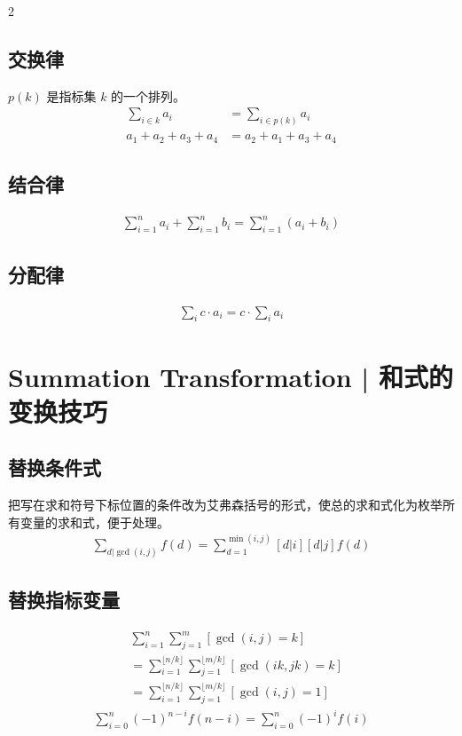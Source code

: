 \documentclass[8pt,a4paper]{article}
\begin{document}
\begin{multicols}{2}
    \subsection{交换律}
    $p(k)$ 是指标集 $k$ 的一个排列。
    \begin{align*}
        \sum_{i \in k} a_i &= \sum_{i \in p(k)} a_i \\
        a_1 + a_2 + a_3 + a_4 &= a_2 + a_1 + a_3 + a_4
    \end{align*}

    \subsection{结合律}
    \begin{align*}
        \sum_{i=1}^{n} a_i + \sum_{i=1}^{n} b_i = \sum_{i=1}^{n} (a_i + b_i)
    \end{align*}

    \subsection{分配律}
    \begin{align*}
        \sum_{i} c \cdot a_i = c \cdot \sum_{i} a_i
    \end{align*}


\section{Summation Transformation | 和式的变换技巧}
    \subsection{替换条件式}
    把写在求和符号下标位置的条件改为艾弗森括号的形式，使总的求和式化为枚举所有变量的求和式，便于处理。
    \begin{align*}
        \sum_{d|\gcd(i,j)} f(d) = \sum_{d=1}^{\min(i,j)} [d|i][d|j]f(d)
    \end{align*}

    \subsection{替换指标变量}
    \begin{align*}
        &\sum_{i=1}^{n} \sum_{j=1}^{m} [\gcd(i,j) = k] \\
        &= \sum_{i=1}^{\lfloor n/k \rfloor} \sum_{j=1}^{\lfloor m/k \rfloor} [\gcd(ik,jk)=k] \\
        &= \sum_{i=1}^{\lfloor n/k \rfloor} \sum_{j=1}^{\lfloor m/k \rfloor} [\gcd(i,j)=1]
    \end{align*}
    \begin{align*}
        \sum_{i=0}^{n} (-1)^{n-i} f(n-i) = \sum_{i=0}^{n} (-1)^{i} f(i)
    \end{align*}


\end{multicols}
\end{document}
